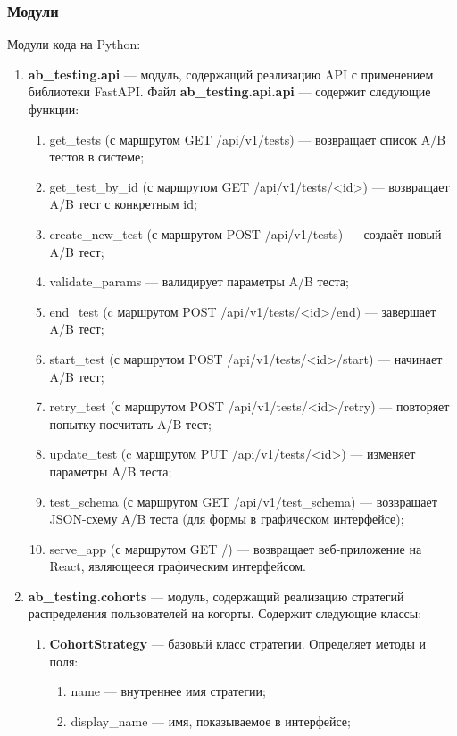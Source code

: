 \documentclass[../document.tex]{subfiles}
\begin{document}
	\subsubsection{Модули}
	\par Модули кода на Python:
	\begin{enumerate}
		\item \textbf{ab\_testing.api} --- модуль, содержащий реализацию API с применением библиотеки FastAPI. Файл \textbf{ab\_testing.api.api} --- содержит следующие функции:
		\begin{enumerate}
			\item get\_tests (с маршрутом GET /api/v1/tests) --- возвращает список A/B тестов в системе;
			\item get\_test\_by\_id (с маршрутом GET /api/v1/tests/<id>) --- возвращает A/B тест с конкретным id;
			\item create\_new\_test (с маршрутом POST /api/v1/tests) --- создаёт новый A/B тест;
			\item validate\_params --- валидирует параметры A/B теста;
			\item end\_test (c маршрутом POST /api/v1/tests/<id>/end) --- завершает A/B тест;
			\item start\_test (с маршрутом POST /api/v1/tests/<id>/start) --- начинает A/B тест;
			\item retry\_test (с маршрутом POST /api/v1/tests/<id>/retry) --- повторяет попытку посчитать A/B тест;
			\item update\_test (c маршрутом PUT /api/v1/tests/<id>) --- изменяет параметры A/B теста;
			\item test\_schema (с маршрутом GET /api/v1/test\_schema) --- возвращает JSON-схему A/B теста (для формы в графическом интерфейсе);
			\item serve\_app (с маршрутом GET /) --- возвращает веб-приложение на React, являющееся графическим интерфейсом.
		\end{enumerate}
		\item \textbf{ab\_testing.cohorts} --- модуль, содержащий реализацию стратегий распределения пользователей на когорты. Содержит следующие классы:
		\begin{enumerate}
			\item \textbf{CohortStrategy} --- базовый класс стратегии. Определяет методы и поля:
			\begin{enumerate}
				\item name --- внутреннее имя стратегии;
				\item display\_name --- имя, показываемое в интерфейсе;

\end{enumerate}
\end{enumerate}
\end{enumerate}
\end{document}
